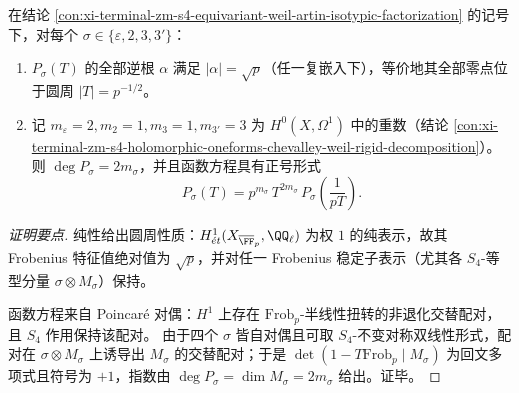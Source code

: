 \begin{conclusion}\label{con:xi-terminal-zm-s4-componentwise-rh-functional-equation-plus}
在结论 \ref{con:xi-terminal-zm-s4-equivariant-weil-artin-isotypic-factorization} 的记号下，对每个 \(\sigma\in\{\varepsilon,2,3,3'\}\)：
\begin{enumerate}
  \item \(P_\sigma(T)\) 的全部逆根 \(\alpha\) 满足 \(|\alpha|=\sqrt p\)（任一复嵌入下），等价地其全部零点位于圆周 \(|T|=p^{-1/2}\)。
  \item 记 \(m_\varepsilon=2,m_2=1,m_3=1,m_{3'}=3\) 为 \(H^0(X,\Omega^1)\) 中的重数（结论 \ref{con:xi-terminal-zm-s4-holomorphic-oneforms-chevalley-weil-rigid-decomposition}）。
  则 \(\deg P_\sigma=2m_\sigma\)，并且函数方程具有正号形式
  \[
  P_\sigma(T)=p^{m_\sigma}\,T^{2m_\sigma}\,P_\sigma\!\left(\frac{1}{pT}\right).
  \]
\end{enumerate}
\end{conclusion}
\begin{proof}[证明要点]
纯性给出圆周性质：\(H^1_{\acute et}(X_{\overline{\FF}_p},\QQ_\ell)\) 为权 \(1\) 的纯表示，故其 Frobenius 特征值绝对值为 \(\sqrt p\)，并对任一 Frobenius 稳定子表示（尤其各 \(S_4\)-等型分量 \(\sigma\otimes M_\sigma\)）保持。
\par
函数方程来自 Poincar\'e 对偶：\(H^1\) 上存在 \(\mathrm{Frob}_p\)-半线性扭转的非退化交替配对，且 \(S_4\) 作用保持该配对。
由于四个 \(\sigma\) 皆自对偶且可取 \(S_4\)-不变对称双线性形式，配对在 \(\sigma\otimes M_\sigma\) 上诱导出 \(M_\sigma\) 的交替配对；于是 \(\det(1-T\mathrm{Frob}_p\mid M_\sigma)\) 为回文多项式且符号为 \(+1\)，指数由 \(\deg P_\sigma=\dim M_\sigma=2m_\sigma\) 给出。证毕。\cite{DeligneWeilII}
\end{proof}

\endinput

